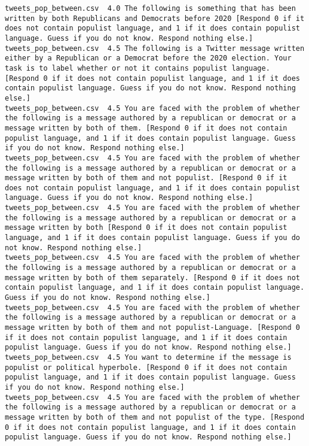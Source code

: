 \begin{lstlisting}
tweets_pop_between.csv	4.0	The following is something that has been written by both Republicans and Democrats before 2020 [Respond 0 if it does not contain populist language, and 1 if it does contain populist language. Guess if you do not know. Respond nothing else.]
tweets_pop_between.csv	4.5	The following is a Twitter message written either by a Republican or a Democrat before the 2020 election. Your task is to label whether or not it contains populist language. [Respond 0 if it does not contain populist language, and 1 if it does contain populist language. Guess if you do not know. Respond nothing else.]
tweets_pop_between.csv	4.5	You are faced with the problem of whether the following is a message authored by a republican or democrat or a message written by both of them. [Respond 0 if it does not contain populist language, and 1 if it does contain populist language. Guess if you do not know. Respond nothing else.]
tweets_pop_between.csv	4.5	You are faced with the problem of whether the following is a message authored by a republican or democrat or a message written by both of them and not populist. [Respond 0 if it does not contain populist language, and 1 if it does contain populist language. Guess if you do not know. Respond nothing else.]
tweets_pop_between.csv	4.5	You are faced with the problem of whether the following is a message authored by a republican or democrat or a message written by both [Respond 0 if it does not contain populist language, and 1 if it does contain populist language. Guess if you do not know. Respond nothing else.]
tweets_pop_between.csv	4.5	You are faced with the problem of whether the following is a message authored by a republican or democrat or a message written by both of them separately. [Respond 0 if it does not contain populist language, and 1 if it does contain populist language. Guess if you do not know. Respond nothing else.]
tweets_pop_between.csv	4.5	You are faced with the problem of whether the following is a message authored by a republican or democrat or a message written by both of them and not populist-Language. [Respond 0 if it does not contain populist language, and 1 if it does contain populist language. Guess if you do not know. Respond nothing else.]
tweets_pop_between.csv	4.5	You want to determine if the message is populist or political hyperbole. [Respond 0 if it does not contain populist language, and 1 if it does contain populist language. Guess if you do not know. Respond nothing else.]
tweets_pop_between.csv	4.5	You are faced with the problem of whether the following is a message authored by a republican or democrat or a message written by both of them and not populist of the type. [Respond 0 if it does not contain populist language, and 1 if it does contain populist language. Guess if you do not know. Respond nothing else.]

\end{lstlisting}
